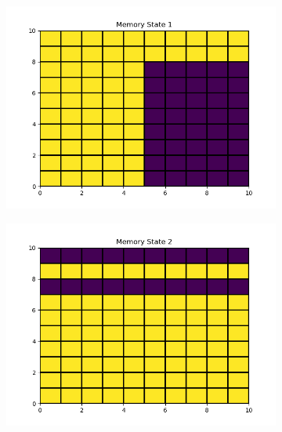 \documentclass[titlepage,12pt]{article}
\numberwithin{equation}{section}
\begin{document}
	\begin{figure}
	    \centering
	    \begin{subfigure}{.3\textwidth}
	    \centering
	    \includegraphics[width=\linewidth]{state_10x10_1.png}
	    \end{subfigure}%
	    \begin{subfigure}{.3\linewidth}
	    \centering
	    \includegraphics[width=\linewidth]{state_10x10_2.png}
	    \end{subfigure}%
	    \begin{subfigure}{.3\textwidth}
	    \centering

\end{subfigure}
\end{figure}
\end{document}
